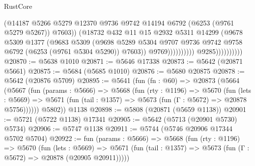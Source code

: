 \begin{lexlean}{RustCore}
\begin{coremodule}
                                          (@14187
                                            @5266
                                            @5279
                                            @12370
                                            @9736
                                            @9742
                                            @14194
                                            @6792
                                            (@6253 (@9761 @5279 @5267))
                                            @7603))
                                        (@18732
                                          @432
                                          @11
                                          @15
                                          @2932
                                          @5311
                                          @14299
                                          (@9678
                                            @5309
                                            @1377
                                            (@9683
                                              @5309
                                              (@9698
                                                @5289
                                                @5304
                                                @9707
                                                @9736
                                                @9742
                                                @9758
                                                @6792
                                                (@6253 (@9761 @5304 @5290))
                                                @7603))
                                            @9769))))))))))
                        @9285))))))))))
@20870 := @5638 @1010
@20871 := @5646 @17338
@20873 := @5642 (@20871 @5661)
@20875 := @5684 (@5685 @1010)
@20876 := @5680 @20875
@20878 := @5642 (@20876 @5709)
@20895 := @5641
    (fun (fn : @60) =>
    @20873
      (@5664
        (@5667
          (fun (params : @5666) =>
          @5668
            (fun (rty : @1196) =>
            @5670
              (fun (lets : @5669) =>
              @5671 (fun (tail : @1357) => @5673 (fun (Γ : @5672) => @20878 @5756))))))
        @5802))
    @1138
@20898 := @5808 (@20871 (@5659 @1138))
@20901 := @5721 (@5722 @1138) @17341
@20905 := @5642 (@5713 (@20901 @5730) @5734)
@20906 := @5747 @1138
@20911 := @5744 (@5746 @20906 @17344 @5702 @5704)
@20922 := fun (params : @5666) =>
  @5668
    (fun (rty : @1196) =>
    @5670
      (fun (lets : @5669) =>
      @5671 (fun (tail : @1357) => @5673 (fun (Γ : @5672) => @20878 (@20905 @20911)))))

\end{coremodule}
\end{lexlean}
